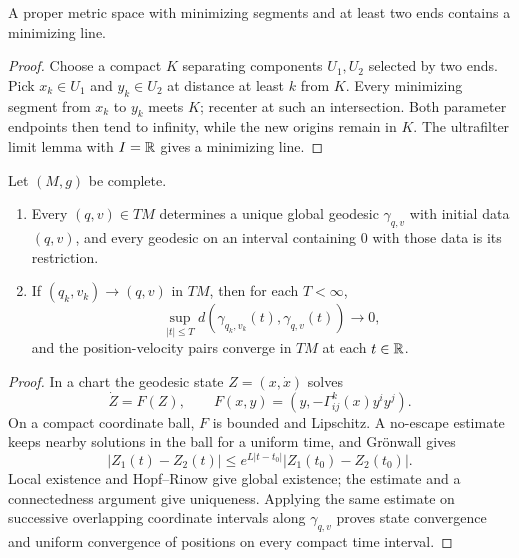 \begin{lemma}
\label{lem:line-exists-metric}






A proper metric space with minimizing segments and at least two ends
contains a minimizing line.
\end{lemma}
\begin{proof}
\sketch

Choose a compact $K$ separating components $U_1,U_2$ selected by two
ends. Pick $x_k\in U_1$ and $y_k\in U_2$ at distance at least $k$ from
$K$. Every minimizing segment from $x_k$ to $y_k$ meets $K$; recenter at
such an intersection. Both parameter endpoints then tend to infinity,
while the new origins remain in $K$. The ultrafilter limit lemma with
$I=\mathbb{R}$ gives a minimizing line.
\end{proof}

\begin{lemma}
\label{lem:geodesic-continuous-dependence}







Let $(M,g)$ be complete.
\begin{enumerate}
\item Every $(q,v)\in TM$ determines a unique global geodesic
$\gamma_{q,v}$ with initial data $(q,v)$, and every geodesic on an
interval containing $0$ with those data is its restriction.
\item If $(q_k,v_k)\to(q,v)$ in $TM$, then for each $T<\infty$,
$$\sup_{|t|\le T}d(\gamma_{q_k,v_k}(t),\gamma_{q,v}(t))\to0,$$
and the position-velocity pairs converge in $TM$ at each $t\in\mathbb{R}$.
\end{enumerate}
\end{lemma}
\begin{proof}
\sketch
{}
In a chart the geodesic state $Z=(x,\dot x)$ solves
$$\dot Z=F(Z),\qquad F(x,y)=(y,-\Gamma^k_{ij}(x)y^iy^j).$$
On a compact coordinate ball, $F$ is bounded and Lipschitz. A no-escape
estimate keeps nearby solutions in the ball for a uniform time, and
Gr\"onwall gives
$$|Z_1(t)-Z_2(t)|\le e^{L|t-t_0|}|Z_1(t_0)-Z_2(t_0)|.$$
Local existence and Hopf--Rinow give global existence; the estimate and
a connectedness argument give uniqueness. Applying the same estimate on
successive overlapping coordinate intervals along $\gamma_{q,v}$ proves
state convergence and uniform convergence of positions on every compact
time interval.
\end{proof}

